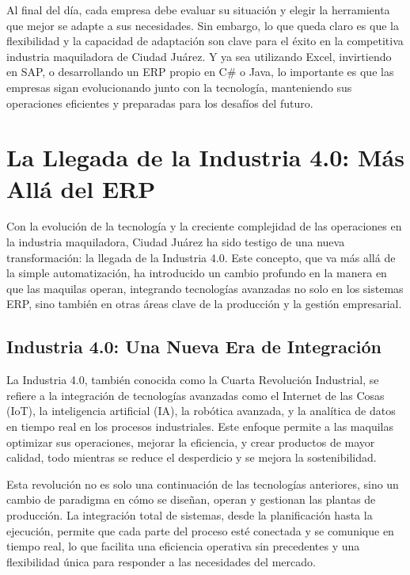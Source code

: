 \documentclass[
  letterpaper,
]{book}
\begin{document}
Al final del día, cada empresa debe evaluar su situación y elegir la
herramienta que mejor se adapte a sus necesidades. Sin embargo, lo que
queda claro es que la flexibilidad y la capacidad de adaptación son
clave para el éxito en la competitiva industria maquiladora de Ciudad
Juárez. Y ya sea utilizando Excel, invirtiendo en SAP, o desarrollando
un ERP propio en C\# o Java, lo importante es que las empresas sigan
evolucionando junto con la tecnología, manteniendo sus operaciones
eficientes y preparadas para los desafíos del futuro.

\section{La Llegada de la Industria 4.0: Más Allá del
ERP}\label{la-llegada-de-la-industria-4.0-muxe1s-alluxe1-del-erp}

Con la evolución de la tecnología y la creciente complejidad de las
operaciones en la industria maquiladora, Ciudad Juárez ha sido testigo
de una nueva transformación: la llegada de la Industria 4.0. Este
concepto, que va más allá de la simple automatización, ha introducido un
cambio profundo en la manera en que las maquilas operan, integrando
tecnologías avanzadas no solo en los sistemas ERP, sino también en otras
áreas clave de la producción y la gestión empresarial.

\subsection{Industria 4.0: Una Nueva Era de
Integración}\label{industria-4.0-una-nueva-era-de-integraciuxf3n}

La Industria 4.0, también conocida como la Cuarta Revolución Industrial,
se refiere a la integración de tecnologías avanzadas como el Internet de
las Cosas (IoT), la inteligencia artificial (IA), la robótica avanzada,
y la analítica de datos en tiempo real en los procesos industriales.
Este enfoque permite a las maquilas optimizar sus operaciones, mejorar
la eficiencia, y crear productos de mayor calidad, todo mientras se
reduce el desperdicio y se mejora la sostenibilidad.

Esta revolución no es solo una continuación de las tecnologías
anteriores, sino un cambio de paradigma en cómo se diseñan, operan y
gestionan las plantas de producción. La integración total de sistemas,
desde la planificación hasta la ejecución, permite que cada parte del
proceso esté conectada y se comunique en tiempo real, lo que facilita
una eficiencia operativa sin precedentes y una flexibilidad única para
responder a las necesidades del mercado.
\end{document}

